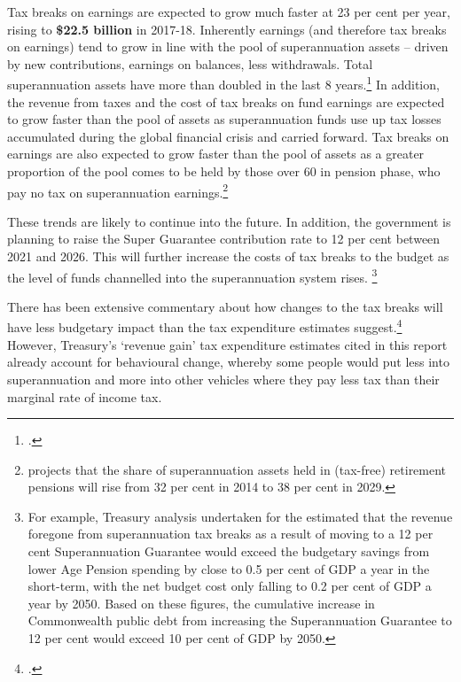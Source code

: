 \documentclass{grattanAlpha}
\begin{document}
Tax breaks on earnings are expected to grow much faster at 23 per cent per year, rising to \textbf{\$22.5 billion} in 2017-18. Inherently earnings (and therefore tax breaks on earnings) tend to grow in line with the pool of superannuation assets – driven by new contributions, earnings on balances, less withdrawals. Total superannuation assets have more than doubled in the last 8 years.\footcite[Table~7]{APRA2014}  
In addition, the revenue from taxes and the cost of tax breaks on fund earnings are expected to grow faster than the pool of assets as superannuation funds use up tax losses accumulated during the global financial crisis and carried forward. Tax breaks on earnings are also expected to grow faster than the pool of assets as a greater proportion of the pool comes to be held by those over 60 in pension phase, who pay no tax on superannuation earnings.\footnote{\textcite[][23]{RiceWarner2015SubmissionTaxWhitePaper} projects that the share of superannuation assets held in (tax-free) retirement pensions will rise from 32 per cent in 2014 to 38 per cent in 2029.}  

These trends are likely to continue into the future. In addition, the government is planning to raise the Super Guarantee contribution rate to 12 per cent between 2021 and 2026. This will further increase the costs of tax breaks to the budget as the level of funds channelled into the superannuation system rises.%
\footnote{For example, Treasury analysis undertaken for the \textcite[][13]{CooperReview2013} estimated that the revenue foregone from superannuation tax breaks as a result of moving to a 12 per cent Superannuation Guarantee would exceed the budgetary savings from lower Age Pension spending by close to 0.5 per cent of GDP a year in the short-term, with the net budget cost only falling to 0.2 per cent of GDP a year by 2050. Based on these figures, the cumulative increase in Commonwealth public debt from increasing the Superannuation Guarantee to 12 per cent would exceed 10 per cent of GDP by 2050.} 

There has been extensive commentary about how changes to the tax breaks will have less budgetary impact than the tax expenditure estimates suggest.\footcites{Clare2015}{ASFA2015TreasurySubmission}{Mercer2013a}{Carling2015} However, Treasury’s ‘revenue gain’ tax expenditure estimates cited in this report already account for behavioural change, whereby some people would put less into superannuation and more into other vehicles where they pay less tax than their marginal rate of income tax. 
\end{document}
